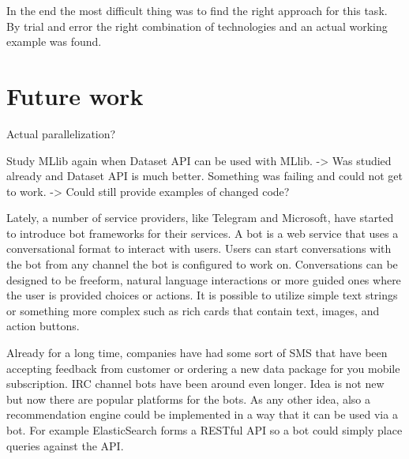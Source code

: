 \documentclass[main.tex]{thesis.tex}
\begin{document}
In the end the most difficult thing was to find the right approach for this task. By trial and error the right combination of technologies and an actual working example was found.

\section{Future work}

Actual parallelization?

Study MLlib again when Dataset API can be used with MLlib. -> Was studied already and Dataset API is much better. Something was failing and could not get to work.
-> Could still provide examples of changed code?

Lately, a number of service providers, like Telegram and Microsoft, have started to introduce bot frameworks for their services. A bot is a web service that uses a conversational format to interact with users. Users can start conversations with the bot from any channel the bot is configured to work on. Conversations can be designed to be freeform, natural language interactions or more guided ones where the user is provided choices or actions. It is possible to utilize simple text strings or something more complex such as rich cards that contain text, images, and action buttons. \cite{bots16}

Already for a long time, companies have had some sort of SMS that have been accepting feedback from customer or ordering a new data package for you mobile subscription. IRC channel bots have been around even longer. Idea is not new but now there are popular platforms for the bots. As any other idea, also a recommendation engine could be implemented in a way that it can be used via a bot. For example ElasticSearch forms a RESTful API so a bot could simply place queries against the API.
\end{document}
